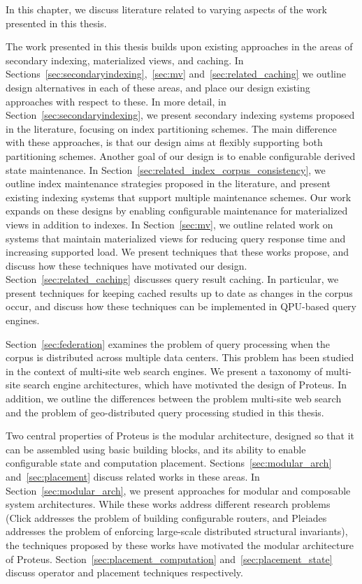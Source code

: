 In this chapter, we discuss literature related to varying aspects of the work presented in this thesis.

The work presented in this thesis builds upon existing approaches in the areas of secondary indexing,
materialized views, and caching.
In Sections~\ref{sec:secondaryindexing},~\ref{sec:mv} and~\ref{sec:related_caching} we outline design alternatives
in each of these areas, and place our design existing approaches with respect to these.
In more detail, in Section~\ref{sec:secondaryindexing},
we present secondary indexing systems proposed in the literature, focusing on index partitioning schemes.
The main difference with these approaches, is that our design aims at flexibly supporting both partitioning schemes.
Another goal of our design is to enable configurable derived state maintenance.
In Section~\ref{sec:related_index_corpus_consistency}, we outline index maintenance strategies proposed in the literature,
and present existing indexing systems that support multiple maintenance schemes.
Our work expands on these designs by enabling configurable maintenance for materialized views in addition to indexes.
In Section~\ref{sec:mv}, we outline related work on systems that maintain materialized views for reducing query response
time and increasing supported load.
We present techniques that these works propose, and discuss how these techniques have motivated our design.
Section~\ref{sec:related_caching} discusses query result caching.
In particular, we present techniques for keeping cached results up to date
as changes in the corpus occur,
and discuss how these techniques can be implemented in QPU-based query engines.

Section~\ref{sec:federation} examines the problem of query processing when the corpus is distributed across multiple data
centers.
This problem has been studied in the context of multi-site web search engines.
We present a taxonomy of multi-site search engine architectures,
which have motivated the design of Proteus.
In addition, we outline the differences between the problem multi-site web search and the problem of geo-distributed
query processing studied in this thesis.

Two central properties of Proteus is the modular architecture, designed so that it can be assembled using basic building blocks,
and its ability to enable configurable state and computation placement.
Sections~\ref{sec:modular_arch} and~\ref{sec:placement} discuss related works in these areas.
In Section~\ref{sec:modular_arch}, we present approaches for modular and composable system architectures.
While these works address different research problems (Click \cite{kohler:click} addresses the problem of building configurable
routers, and Pleiades \cite{bouget:pleiades} addresses the problem of enforcing large-scale distributed structural invariants),
the techniques proposed by these works have motivated the modular architecture of Proteus.
Section~\ref{sec:placement_computation} and~\ref{sec:placement_state} discuss
operator and placement techniques respectively.

